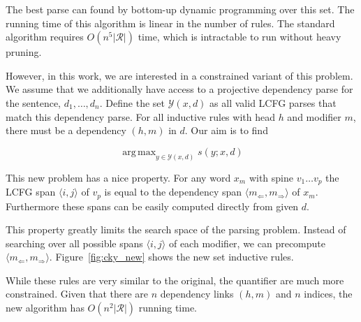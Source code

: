 \documentclass[11pt,letterpaper]{article}
\DeclareMathOperator*{\argmax}{arg\,max}
\newcommand{\rules}{\mathcal{R}}
\newcommand{\Left}[1]{#1_{\Leftarrow}}
\newcommand{\Right}[1]{#1_{\Rightarrow}}
\newcommand{\Span}[1]{\langle #1 \rangle}
\begin{document}
 The best parse can found by bottom-up dynamic programming
 over this set. The running time of this algorithm is linear in the
 number of rules. The standard algorithm requires $O(n^5 |\rules|)$ time, which is intractable to run without heavy pruning.



 However, in this work, we are interested in a constrained variant of
 this problem. We assume that we additionally have access to a
 projective dependency parse for the sentence, $d_1, \ldots, d_n$.
 Define the set $\mathcal{Y}(x,d)$ as all valid LCFG parses that match
 this dependency parse. For all inductive rules with head $h$ and modifier
$m$, there must be a dependency $(h, m)$ in $d$.  Our aim is to find

\[ \argmax_{y \in \mathcal{Y}(x, d)} s(y; x, d)\]

This new problem has a nice property. For any word $x_m$ with spine $v_1 \ldots v_p$ the LCFG span  $\Span{i,j}$ of $v_p$ is equal to the dependency span $\langle \Left{m},\Right{m}\rangle$ of $x_m$. Furthermore these spans can be easily computed directly from given $d$.

This property greatly limits the search space of the parsing problem.
Instead of searching over all possible spans $\Span{i, j}$ of each modifier, we can
precompute $\langle \Left{m},\Right{m}\rangle$. Figure~\ref{fig:cky_new} shows the new set inductive rules.

While these rules are very similar to the original, the quantifier are
much more constrained. Given that there are $n$ dependency links $(h, m)$ and $n$ indices, the new algorithm has $O(n^2|\rules|)$ running time.







%

\end{document}
